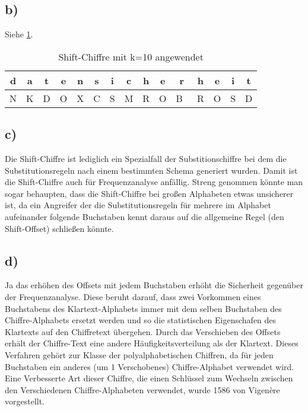 \documentclass[10pt,a4paper]{article}
\begin{document}
\subsection*{b)}
Siehe \ref{tbl:encryption}. 
\begin{table}[htdp]
\caption{Shift-Chiffre mit k=10 angewendet}
\begin{center}
\begin{tabular}{|c|c|c|c|c|c|c|c|c|c|c|c|c|c|c|}
	d & a &  t & e & n & s & i & c & h & e & r & h & e  & i & t \\ \hline
	 N & K & D & O & X & C & S & M & R & O & B\ & R & O & S & D \\ \hline
\end{tabular}
\end{center}
\label{tbl:encryption}
\end{table}%
\subsection*{c)}
Die Shift-Chiffre ist lediglich ein Spezialfall der Substitionschiffre bei dem die Substitutionsregeln nach einem bestimmten Schema generiert wurden. Damit ist die Shift-Chiffre auch für Frequenzanalyse anfällig. Streng genommen könnte man sogar behaupten, dass die Shift-Chiffre bei großen Alphabeten etwas unsicherer ist, da ein Angreifer der die Substitutionsregeln für mehrere im Alphabet aufeinander folgende Buchstaben kennt daraus auf die allgemeine Regel (den Shift-Offset) schließen könnte.
\subsection*{d)}
Ja das erhöhen des Offsets mit jedem Buchstaben erhöht die Sicherheit gegenüber der Frequenzanalyse. Diese beruht darauf, dass zwei Vorkommen eines Buchstabens des Klartext-Alphabets immer mit dem selben Buchstaben des Chiffre-Alphabets ersetzt werden und so die statistischen Eigenschafen des Klartexts auf den Chiffretext übergehen. Durch das Verschieben des Offsets erhält der Chiffre-Text eine andere Häufigkeitsverteilung als der Klartext. Dieses Verfahren gehört zur Klasse der polyalphabetischen Chiffren, da für jeden Buchstaben ein anderes (um 1 Verschobenes) Chiffre-Alphabet verwendet wird. Eine Verbesserte Art dieser Chiffre, die einen Schlüssel zum Wechseln zwischen den Verschiedenen Chiffre-Alphabeten verwendet, wurde 1586 von Vigenère vorgestellt.
\end{document}
